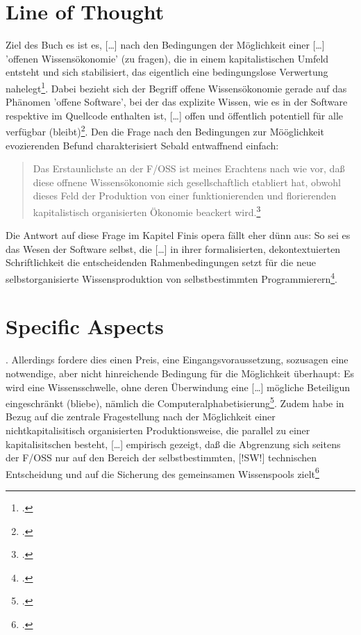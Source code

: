 \documentclass[DIV=calc,BCOR=5mm,11pt,headings=small,oneside,abstract=true, toc=bib]{scrartcl}
\begin{document}
\section{Line of Thought}

Ziel des Buch es ist es, \glqq{}[\ldots] nach den Bedingungen der Möglichkeit
einer [\ldots] 'offenen Wissensökonomie' (zu fragen), die in einem
kapitalistischen Umfeld entsteht und sich stabilisiert, das eigentlich eine
bedingungslose Verwertung nahelegt\grqq{}\footcite[vgl.][17]{Sebald2008a}. Dabei
bezieht sich der Begriff \glqq{}offene Wissensökonomie\grqq{} gerade auf das
Phänomen 'offene Software', bei der das
\glqq{}explizite Wissen\grqq{}, wie es in der \glqq{}Software\grqq{}
respektive im \glqq{}Quellcode\grqq{} enthalten ist, \glqq{}[\ldots] offen und
öffentlich potentiell für alle verfügbar
(bleibt)\grqq{}\footcite[vgl.][17]{Sebald2008a}. Den die Frage nach den
Bedingungen zur Mööglichkeit evozierenden Befund charakterisiert Sebald
entwaffnend einfach:

\begin{quotation}
  \glqq{}Das Erstaunlichste an der F/OSS ist meines Erachtens nach wie
  vor, daß diese offnene Wissensökonomie sich gesellschaftlich etabliert
  hat, obwohl dieses Feld der Produktion von einer funktionierenden und
  florierenden kapitalistisch organisierten Ökonomie beackert
  wird.\grqq{}\footcite[vgl.][23]{Sebald2008a}
\end{quotation} 

Die Antwort auf diese Frage im Kapitel \glqq{}Finis opera\grqq{} fällt eher dünn
aus: So sei es das Wesen der \glqq{}Software\grqq{} selbst, die \glqq{}[\ldots] in ihrer
formalisierten, dekontextuierten Schriftlichkeit die entscheidenden
Rahmenbedingungen setzt für die neue selbstorganisierte Wissensproduktion
von selbstbestimmten Programmierern\grqq{}\footcite[vgl.][236]{Sebald2008a}.
\section{Specific Aspects}. Allerdings fordere dies einen Preis, eine
Eingangsvoraussetzung, sozusagen eine notwendige, aber nicht hinreichende
Bedingung für die Möglichkeit überhaupt: Es wird eine
\glqq{}Wissensschwelle\grqq{}, ohne deren Überwindung eine \glqq{}[\ldots]
mögliche Beteiligun eingeschränkt (bliebe)\grqq{}, nämlich die
\glqq{}Computeralphabetisierung\grqq{}\footcite[vgl.][236]{Sebald2008a}.
Zudem habe \glqq{}in Bezug auf die zentrale
Fragestellung nach der Möglichkeit einer nichtkapitalisitisch organisierten Produktionsweise,
die parallel zu einer kapitalisitschen besteht, [\ldots] empirisch
gezeigt, daß die Abgrenzung sich seitens der F/OSS nur auf den Bereich
der selbstbestimmten, [!SW!] technischen Entscheidung und auf die
Sicherung des gemeinsamen Wissenspools
zielt\grqq{}\footcite[vgl.][237f]{Sebald2008a}
\end{document}
